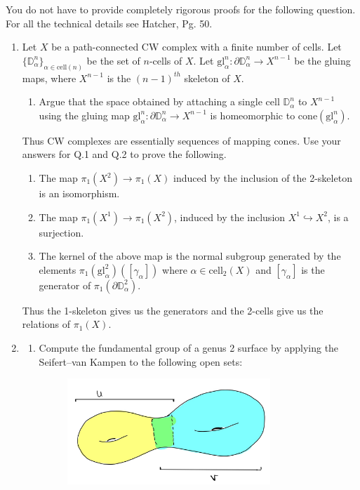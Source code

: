 \documentclass{article}
\begin{document}
    You do not have to provide completely rigorous proofs for the following question.
    For all the technical details see Hatcher, Pg. 50.
    \begin{enumerate}[resume]
    \item 
    Let $X$ be a path-connected CW complex with a finite number of cells. 
    Let $\{\mathbb{D}^n_\alpha\}_{\alpha \in \mathrm{cell}(n)}$ be the set of $n$-cells of $X$.
    Let $\mathrm{gl}_\alpha^n : \partial \mathbb{D}_\alpha^n \to X^{n-1}$ be the gluing maps, where $X^{n-1}$ is the ${(n-1)}^{th}$ skeleton of $X$.
    \begin{enumerate}
        \item Argue that the space obtained by attaching a single cell $\mathbb{D}_\alpha^n$ to $X^{n-1}$ using the gluing map 
        $\mathrm{gl}_\alpha^n : \partial \mathbb{D}_\alpha^n \to X^{n-1}$
        is homeomorphic to $\mathrm{cone}(\mathrm{gl}_\alpha^n)$.
        \end{enumerate}
        Thus CW complexes are essentially sequences of mapping cones.
        Use your answers for Q.1 and Q.2 to prove the following.
        \begin{enumerate}[resume]
        \item 
        The map $\pi_1(X^2) \to \pi_1(X)$ induced by the inclusion of the 2-skeleton is an isomorphism.
        
        \item The map $\pi_1(X^1) \to \pi_1(X^2)$, induced by the inclusion $X^1 \hookrightarrow X^2$, is a surjection.
        \item The kernel of the above map is the normal subgroup generated by the elements  $\pi_1(\mathrm{gl}^2_\alpha)\left([\gamma_\alpha]\right)$ where $\alpha \in \mathrm{cell}_2(X)$ and $[\gamma_\alpha]$ is the generator of $\pi_1(\partial \mathbb{D}^2_\alpha)$.
    \end{enumerate}
    Thus the 1-skeleton gives us the generators and the 2-cells give us the relations of $\pi_1(X)$.
    
    \item 
    \begin{enumerate}
        \item Compute the fundamental group of a genus 2 surface by applying the Seifert--van Kampen to the following open sets:
        \begin{figure}[H]
            \centering          \includegraphics[height=4cm]{images/genus2-seifert-van-kampen.jpg} 
        \end{figure}
        

\end{enumerate}
\end{enumerate}
\end{document}
